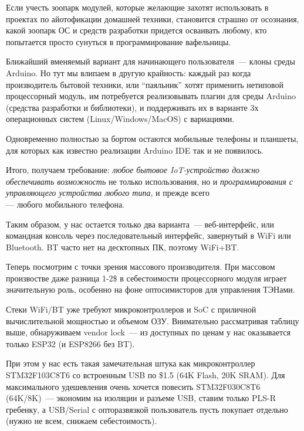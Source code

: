 Если учесть зоопарк модулей, которые желающие захотят использовать в проектах по
айотофикации домашней техники, становится страшно
от осознания, какой зоопарк ОС и средств разработки придется осваивать любому,
кто попытается просто сунуться в программирование вафельницы.

Ближайший вменяемый вариант для начинающего пользователя\ --- клоны среды
Arduino. Но тут мы влипаем в другую крайность: каждый раз когда производитель
бытовой техники, или ``паяльник'' хотят применить нетиповой процессорный модуль,
им потребуется реализовывать плагин для среды Arduino (средства разработки и
библиотеки), и поддерживать их в варианте 3х операционных систем
(Linux/Windows/MacOS) с вариациями.

Одновременно полностью за бортом остаются мобильные телефоны и планшеты, для
которых как известно реализации Arduino IDE так и не появилось.

\begin{framed}\noindent
Итого, получаем требование: \emph{любое бытовое IoT-устройство должно
обеспечивать возможность} не только использования, но и \emph{программирования с
управляющего устройства любого типа}, и прежде всего\\ --- любого мобильного
телефона.
\end{framed}

Таким образом, у нас остается только два варианта\ --- веб-интерфейс, или
командная консоль через последовательный интерфейс, завернутый в WiFi или
Bluetooth. BT часто нет на десктопных ПК, поэтому WiFi+BT.

\clearpage
Теперь посмотрим с точки зрения массового производителя. При массовом
произвостве даже разница 1-2\$ в себестоимости процессорного модуля играет
значительную роль, особенно на фоне оптосимисторов для управления ТЭНами.

Стеки WiFi/BT уже требуют микроконтроллеров и SoC с приличной вычислительной
мощностью и объемом ОЗУ. Внимательно рассматривая таблицу выше, обнаруживаем
vendor lock\ --- из доступных по ценам у нас оказывается только ESP32 (и ESP8266
без BT).

При этом у нас есть такая замечательная штука как микроконтроллер STM32F103C8T6
со встроенным USB по \$1.5 (64K Flash, 20K SRAM). Для максимального удешевления
очень хочется повесить STM32F030C8T6 (64K/8K)\ ---
экономим на изоляции и разъеме USB, ставим только PLS-R гребенку, а USB/Serial с
опторазвязкой пользователь пусть покупает отдельно (нужно не всем, снижаем
себестоимость).

